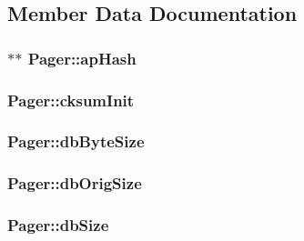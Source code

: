 \subsection{Member Data Documentation}
\hypertarget{struct_pager_a6d78f3ba95ed2693c0e36fb8a979e2d1}{
\subsubsection[{ap\-Hash}]{$\ast$$\ast$ Pager\-::ap\-Hash}}\label{d0/dba/struct_pager_a6d78f3ba95ed2693c0e36fb8a979e2d1}
\hypertarget{struct_pager_a93551028ee3c8953904e8db1afe96353}{
\subsubsection[{cksum\-Init}]{ Pager\-::cksum\-Init}}\label{d0/dba/struct_pager_a93551028ee3c8953904e8db1afe96353}
\hypertarget{struct_pager_a1c9e52247b26f6df497c920d4aaac0c4}{
\subsubsection[{db\-Byte\-Size}]{ Pager\-::db\-Byte\-Size}}\label{d0/dba/struct_pager_a1c9e52247b26f6df497c920d4aaac0c4}
\hypertarget{struct_pager_a701f357add2315f86d1529d41aa0d703}{
\subsubsection[{db\-Orig\-Size}]{ Pager\-::db\-Orig\-Size}}\label{d0/dba/struct_pager_a701f357add2315f86d1529d41aa0d703}
\hypertarget{struct_pager_ab7ffb34750348f688f5aab803b20e99b}{
\subsubsection[{db\-Size}]{ Pager\-::db\-Size}}\label{d0/dba/struct_pager_ab7ffb34750348f688f5aab803b20e99b}
